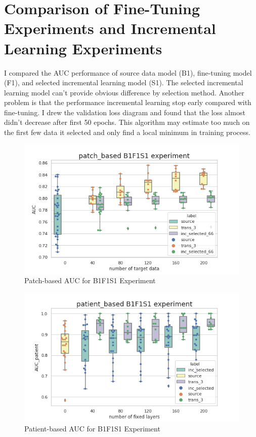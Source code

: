 \section{Comparison of Fine-Tuning Experiments and Incremental Learning Experiments}
I compared the AUC performance of source data model (B1), fine-tuning model (F1), and selected incremental learning model (S1). The selected incremental learning model can't provide obvious difference by selection method. Another problem is that the performance incremental learning stop early compared with fine-tuning. I drew the validation loss diagram and found that the loss almost didn't decrease after first 50 epochs. This algorithm may estimate too much on the first few data it selected and only find a local minimum in training process.

\begin{figure}[H]
    \hfil
    \begin{minipage}[t]{0.9\textwidth}
        \includegraphics[width=\textwidth]{fig/B1F1S1_num_patch.png}
        \caption{\label{fig:parallel1}Patch-based AUC for B1F1S1 Experiment}
    \end{minipage}
    \hfil
\end{figure}
\begin{figure}[H]
    \hfil
    \begin{minipage}[t]{0.9\textwidth}
        \includegraphics[width=\textwidth]{fig/B1F1S1_num_patient.png}
        \caption{\label{fig:parallel1}Patient-based AUC for B1F1S1 Experiment}
    \end{minipage}
    \hfil
\end{figure}
